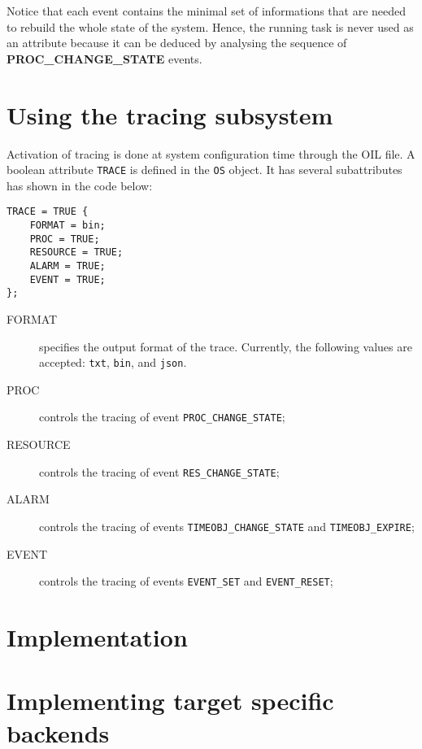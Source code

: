 Notice that each event contains the minimal set of informations that are needed
to rebuild the whole state of the system.
Hence, the running task is never used as an attribute because it can be deduced
by analysing the sequence of \textbf{PROC\_CHANGE\_STATE} events.

\section{Using the tracing subsystem}

Activation of tracing is done at system configuration time through the OIL file.
A boolean attribute \texttt{TRACE} is defined in the \texttt{OS} object. It has
several subattributes has shown in the code below:

\begin{lstlisting}[language=OIL]
TRACE = TRUE {
    FORMAT = bin;
    PROC = TRUE;
    RESOURCE = TRUE;
    ALARM = TRUE;
    EVENT = TRUE;
};
\end{lstlisting}

\begin{description}
  \item[FORMAT] specifies the output format of the trace. Currently, the
    following values are accepted: \texttt{txt}, \texttt{bin}, and
    \texttt{json}.

  \item[PROC] controls the tracing of event \texttt{PROC\_CHANGE\_STATE};

  \item[RESOURCE] controls the tracing of event \texttt{RES\_CHANGE\_STATE};

  \item[ALARM] controls the tracing of events \texttt{TIMEOBJ\_CHANGE\_STATE}
    and \texttt{TIMEOBJ\_EXPIRE};

  \item[EVENT]  controls the tracing of events \texttt{EVENT\_SET}
    and \texttt{EVENT\_RESET};
\end{description}


\section{Implementation}

\section{Implementing target specific backends}
\label{sec:trace:targetbackend}

